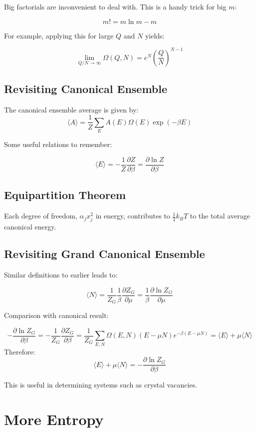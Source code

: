 \documentclass[12pt]{article}
\begin{document}
Big factorials are inconvenient to deal with. This is a handy trick for big $m$:

\[ \boxed{ m! = m\ln{m} - m}\]

For example, applying this for large $Q$ and $N$ yields:

\[\lim_{Q/N\to\infty}\Omega(Q,N) = e^N \left(\frac{Q}{N}\right)^{N-1}\]

\subsection{Revisiting Canonical Ensemble}

The canonical ensemble average is given by:
\[\langle A \rangle = \frac{1}{Z}\sum_E A(E)\Omega(E)\exp{(-\beta E)}\]

Some useful relations to remember:

\[\boxed{\langle E \rangle = -\frac{1}{Z}\frac{\partial Z}{\partial \beta} = \frac{\partial \ln Z}{\partial \beta}}\]


\subsection{Equipartition Theorem}

Each degree of freedom, $\alpha_j x_j^2$ in energy, contributes to $\frac12 k_B T$ to the total average canonical energy.


\subsection{Revisiting Grand Canonical Ensemble}

Similar definitions to earlier leads to:

\[\boxed{\langle N \rangle = \frac{1}{Z_G}\frac{1}{\beta}\frac{\partial Z_G}{\partial \mu}} = \frac{1}{\beta}\frac{\partial \ln Z_G}{\partial \mu}\]

Comparison with canonical result:

\[-\frac{\partial \ln Z_G}{\partial \beta} = -\frac{1}{Z_G}\frac{\partial Z_G}{\partial \beta} = \frac{1}{Z_G}\sum_{E,N}\Omega(E,N)(E-\mu N)e^{-\beta(E-\mu N)} = \langle E \rangle + \mu \langle N \rangle\]
Therefore:
\[\boxed{\langle E \rangle + \mu \langle N \rangle = -\frac{\partial \ln Z_G}{\partial \beta}}\]

This is useful in determining systems such as crystal vacancies.

\section{More Entropy}
\end{document}
